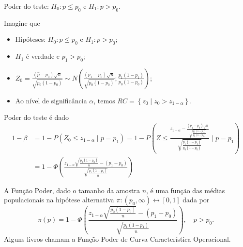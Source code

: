 \documentclass[8pt]{beamer}
\begin{document}
\begin{frame}{Poder do teste: $H_0: p \leq p_0$ e $H_1: p > p_0$.}

\scriptsize

Imagine que 
\begin{itemize}
	\item Hipóteses: $H_0:p \leq p_0$ e $H_1: p > p_0$;
	\item $H_1$ é verdade e $p_1 > p_0$;
	\item $Z_0 = \frac{(\hat{p}-p_0)\sqrt{n}}{\sqrt{p_0 (1-p_0)}} \sim N \left( \frac{(p_1 - p_0)\sqrt{n}}{\sqrt{p_0(1-p_0)}}; \frac{p_1(1-p_1)}{p_0(1-p_0)} \right)$;
	\item Ao nível de significância $\alpha$, temos $RC = \left\{ z_0 \mid z_0 > z_{1-\alpha}  \right\}$.
\end{itemize}

Poder do teste é dado
\begin{align*}
1-\beta &= 1 - P\left( Z_0 \leq z_{1-\alpha} \mid p=p_1 \right) = 1 - P \left( 
Z \leq \frac{ z_{1-\alpha} - \frac{(p_1 - p_0)\sqrt{n}}{\sqrt{ \frac{p_1(1-p_1)}{p_0(1-p_0)} }} }{ \sqrt{ \frac{p_1(1-p_1)}{p_0(1-p_0)} } }
\mid p = p_1 \right)\\
&= 1-  \Phi\left( \frac{ z_{1-\alpha} \sqrt{ \frac{p_0(1-p_0)}{n}} - (p_1 - p_0)  }{ \sqrt{ \frac{ p_1(1-p_1) }{ n } } } \right) 
\end{align*}

A \textcolor{important}{Função Poder}, dado o tamanho da amostra $n$, é uma função das médias populacionais na hipótese alternativa $\pi: (p_0, \infty) \longleftrightarrow [0,1] $ dada por
$$\pi(p) = 1-  \Phi\left( \frac{ z_{1-\alpha} \sqrt{ \frac{p_0(1-p_0)}{n}} - (p_1 - p_0)  }{ \sqrt{ \frac{ p_1(1-p_1) }{ n } } } \right), \quad p > p_0.$$
Alguns livros chamam a Função Poder de \textcolor{important}{Curva Característica Operacional}.

\normalsize

\end{frame}
\end{document}
